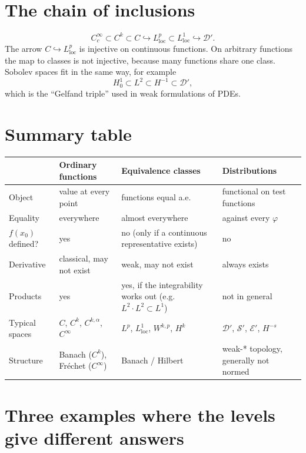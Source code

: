 \documentclass[11pt]{article}
\newcommand{\D}{\mathcal{D}}
\newcommand{\Sch}{\mathcal{S}}
\newcommand{\E}{\mathcal{E}}
\newcommand{\Lloc}{L^1_{\mathrm{loc}}}
\newcommand{\Cc}{C_c^\infty}
\begin{document}
\section{The chain of inclusions}

\[
  \Cc \subset C^k \subset C \hookrightarrow L^p_{\mathrm{loc}}
  \subset \Lloc \hookrightarrow \D' .
\]
The arrow $C\hookrightarrow L^p_{\mathrm{loc}}$ is injective on continuous
functions. On arbitrary functions the map to classes is not injective, because
many functions share one class. Sobolev spaces fit in the same way, for example
\[
  H^1_0 \subset L^2 \subset H^{-1} \subset \D',
\]
which is the ``Gelfand triple'' used in weak formulations of PDEs.

\section{Summary table}

\begin{center}
\renewcommand{\arraystretch}{1.3}
\small
\begin{tabular}{>{\raggedright}p{2.6cm} >{\raggedright}p{3.6cm}
                >{\raggedright}p{3.9cm} >{\raggedright\arraybackslash}p{3.9cm}}
  \toprule
  & \textbf{Ordinary functions} & \textbf{Equivalence classes}
  & \textbf{Distributions} \\
  \midrule
  Object & value at every point & functions equal a.e.
    & functional on test functions \\
  Equality & everywhere & almost everywhere & against every $\varphi$ \\
  $f(x_0)$ defined? & yes
    & no (only if a continuous representative exists) & no \\
  Derivative & classical, may not exist & weak, may not exist
    & always exists \\
  Products & yes
    & yes, if the integrability works out (e.g.\ $L^2\cdot L^2\subset L^1$)
    & not in general \\
  Typical spaces & $C$, $C^k$, $C^{k,\alpha}$, $C^\infty$
    & $L^p$, $\Lloc$, $W^{k,p}$, $H^k$
    & $\D'$, $\Sch'$, $\E'$, $H^{-s}$ \\
  Structure & Banach ($C^k$), Fr\'echet ($C^\infty$) & Banach / Hilbert
    & weak-* topology, generally not normed \\
  \bottomrule
\end{tabular}
\end{center}

\section{Three examples where the levels give different answers}
\end{document}
